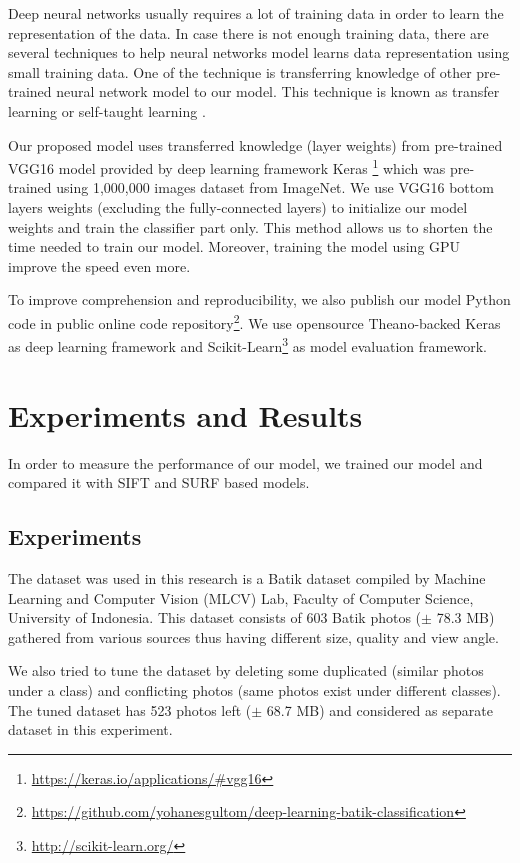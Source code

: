 \documentclass[conference]{IEEEtran}
\begin{document}
Deep neural networks usually requires a lot of training data in order to learn the representation of the data. In case there is not enough training data, there are several techniques to help neural networks model learns data representation using small training data. One of the technique is transferring knowledge of other pre-trained neural network model to our model. This technique is known as transfer learning or self-taught learning \cite{raina2007self}.

Our proposed model uses transferred knowledge (layer weights) from pre-trained VGG16 model provided by deep learning framework Keras \footnote{\url{https://keras.io/applications/\#vgg16}} which was pre-trained using 1,000,000 images dataset from ImageNet. We use VGG16 bottom layers weights (excluding the fully-connected layers) to initialize our model weights and train the classifier part only. This method allows us to shorten the time needed to train our model. Moreover, training the model using GPU improve the speed even more.

To improve comprehension and reproducibility, we also publish our model Python code in public online code repository\footnote{\url{https://github.com/yohanesgultom/deep-learning-batik-classification}}. We use opensource Theano-backed Keras as deep learning framework and Scikit-Learn\footnote{\url{http://scikit-learn.org/}} as model evaluation framework.

\section{Experiments and Results}

In order to measure the performance of our model, we trained our model and compared it with SIFT and SURF based models.

\subsection{Experiments}

The dataset was used in this research is a Batik dataset compiled by Machine Learning and Computer Vision (MLCV) Lab, Faculty of Computer Science, University of Indonesia. This dataset consists of 603 Batik photos ($\pm$ 78.3 MB) gathered from various sources thus having different size, quality and view angle.

We also tried to tune the dataset by deleting some duplicated (similar photos under a class) and conflicting photos (same photos exist under different classes). The tuned dataset has 523 photos left ($\pm$ 68.7 MB) and considered as separate dataset in this experiment.
\end{document}
